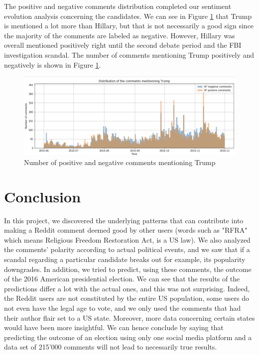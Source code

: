 \documentclass[11pt]{article}
\begin{document}
The positive and negative comments distribution completed our sentiment evolution analysis concerning the candidates. We can see in Figure \ref{Trump_hist} that Trump is mentioned a lot more than Hillary, but that is not necessarily a good sign since the majority of the comments are labeled as negative. However, Hillary was overall mentioned positively right until the second debate period and the FBI investigation scandal. The number of  comments mentioning Trump positively and negatively is shown in Figure \ref{Trump_hist}.

\begin{figure}[H]
\centering\includegraphics[scale=0.17]{Images/trump_comments.png}
\caption{Number of positive and negative comments mentioning Trump}
\label{Trump_hist}
\end{figure}


\section{Conclusion}
In this project, we discovered the underlying patterns that can contribute into making a Reddit comment deemed good by other users (words such as "RFRA" which means Religious Freedom Restoration Act, is a US law). We also analyzed the comments' polarity according to actual political events, and we saw that if a scandal regarding a particular candidate breaks out for example, its popularity downgrades. In addition, we tried to predict, using these comments, the outcome of the 2016 American presidential election. We can see that the results of the predictions differ a lot with the actual ones, and this was not surprising. Indeed, the Reddit users are not constituted by the entire US population, some users do not even have the legal age to vote, and we only used the comments that had their author flair set to a US state. Moreover, more data concerning certain states would have been more insightful. We can hence conclude by saying that predicting the outcome of an election using only one social media platform and a data set of 215'000 comments will not lead to necessarily true results.
\end{document}

